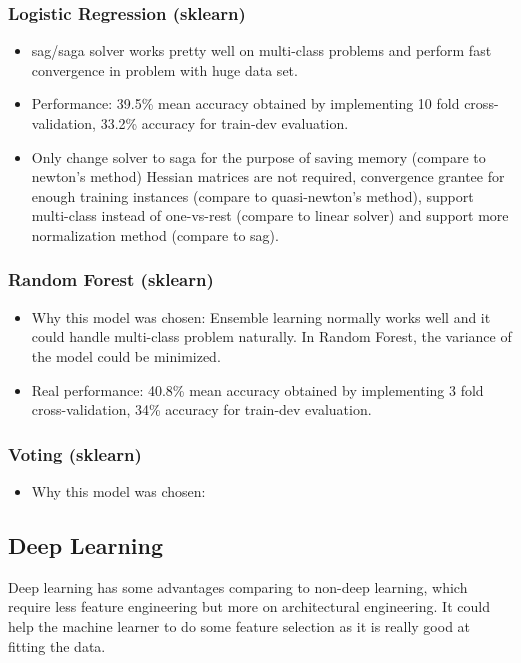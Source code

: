 \documentclass[11pt]{article}
\begin{document}
\subsubsection{Logistic Regression (sklearn)}
\begin{itemize}

\item 
sag/saga solver works pretty well on 
multi-class problems and perform fast convergence in problem with huge data set.

\item
Performance:
39.5\% mean accuracy obtained by implementing 10 fold cross-validation, 
33.2\% accuracy for 
train-dev evaluation.

\item 
Only change solver to saga for the purpose of saving memory
(compare to newton's method) Hessian matrices are not required, 
convergence grantee for enough training instances (compare to quasi-newton's method),
support multi-class instead of one-vs-rest (compare to linear solver) and support more
normalization method (compare to sag).

\end{itemize}

\subsubsection{Random Forest (sklearn)}
\begin{itemize}
\item Why this model was chosen: Ensemble learning normally works well and 
it could handle multi-class problem naturally. In Random Forest, the
variance of the model could be minimized.

\item Real performance: 40.8\% mean accuracy obtained by implementing 3 fold cross-validation, 
34\% accuracy for train-dev evaluation.
\end{itemize}

\subsubsection{Voting (sklearn)}
\begin{itemize}
\item Why this model was chosen:
\end{itemize}

\subsection{Deep Learning}
Deep learning has some advantages comparing to non-deep learning, which require less
feature engineering but more on architectural engineering. It could help the machine 
learner to do some feature selection as it is really good at fitting the data.
\end{document}
